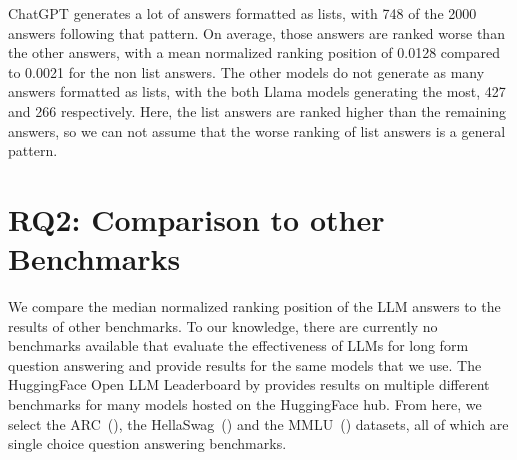 ChatGPT generates a lot of answers formatted as lists, with 748 of the 2000 answers following that pattern.
On average, those answers are ranked worse than the other answers, with a mean normalized ranking position of 0.0128 compared to 0.0021 for the non list answers.
The other models do not generate as many answers formatted as lists, with the both Llama models generating the most, 427 and 266 respectively.
Here, the list answers are ranked higher than the remaining answers, so we can not assume that the worse ranking of list answers is a general pattern.

\section{RQ2: Comparison to other Benchmarks}\label{sec:benchmark_comparison}
We compare the median normalized ranking position of the LLM answers to the results of other benchmarks.
To our knowledge, there are currently no benchmarks available that evaluate the effectiveness of LLMs for long form question answering and provide results for the same models that we use.
The HuggingFace Open LLM Leaderboard by \cite{beeching:2023:Open} provides results on multiple different benchmarks for many models hosted on the HuggingFace hub.
From here, we select the ARC~(\cite{clark:2018:Think}), the HellaSwag~(\cite{zellers:2019:HellaSwag}) and the MMLU~(\cite{hendrycks:2020:Measuring}) datasets, all of which are single choice question answering benchmarks.
